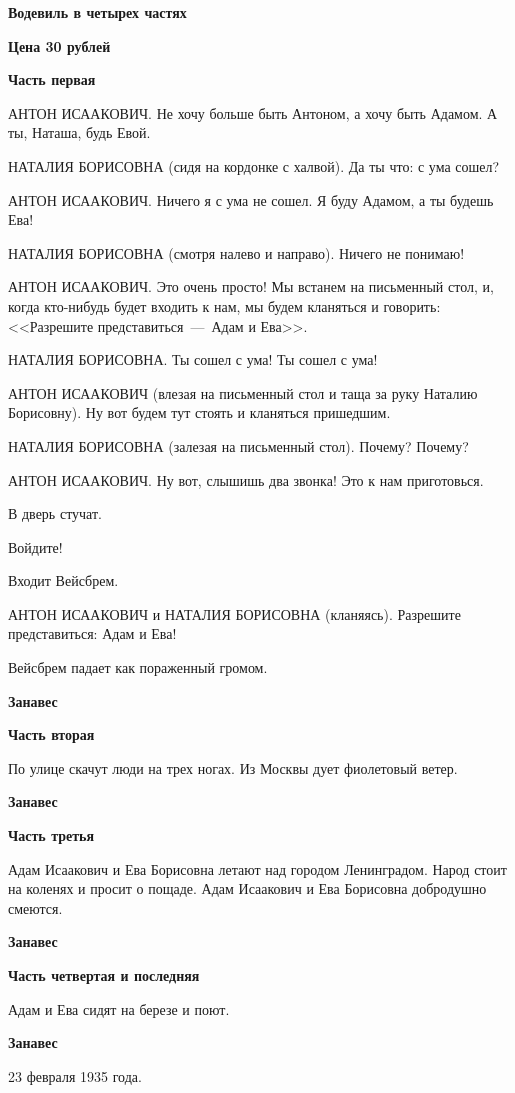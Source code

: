 \textbf{Водевиль в четырех частях}

\textbf{Цена 30 рублей}

\textbf{Часть первая}

АНТОН ИСААКОВИЧ. Не хочу больше быть Антоном, а хочу быть Адамом. А ты, Наташа, будь Евой.

НАТАЛИЯ БОРИСОВНА (сидя на кордонке с халвой). Да ты что: с ума сошел?

АНТОН ИСААКОВИЧ. Ничего я с ума не сошел. Я буду Адамом, а ты будешь Ева!

НАТАЛИЯ БОРИСОВНА (смотря налево и направо). Ничего не понимаю!

АНТОН ИСААКОВИЧ. Это очень просто! Мы встанем на письменный стол, и, когда кто-нибудь будет входить к нам, мы будем кланяться и говорить: <<Разрешите представиться\ ---~Адам и Ева>>.

НАТАЛИЯ БОРИСОВНА. Ты сошел с ума! Ты сошел с ума!

АНТОН ИСААКОВИЧ (влезая на письменный стол и таща за руку Наталию Борисовну). Ну вот будем тут стоять и кланяться пришедшим.

НАТАЛИЯ БОРИСОВНА (залезая на письменный стол). Почему? Почему?

АНТОН ИСААКОВИЧ. Ну вот, слышишь два звонка! Это к нам приготовься.

В дверь стучат.

Войдите!

Входит Вейсбрем.

АНТОН ИСААКОВИЧ и НАТАЛИЯ БОРИСОВНА (кланяясь). Разрешите представиться: Адам и Ева!

Вейсбрем падает как пораженный громом.

\textbf{Занавес}

\textbf{Часть вторая}

По улице скачут люди на трех ногах. Из Москвы дует фиолетовый ветер.

\textbf{Занавес}

\textbf{Часть третья}

Адам Исаакович и Ева Борисовна летают над городом Ленинградом. Народ стоит на коленях и просит о пощаде. Адам Исаакович и Ева Борисовна добродушно смеются.

\textbf{Занавес}

\textbf{Часть четвертая и последняя}

Адам и Ева сидят на березе и поют.

\textbf{Занавес}

23 февраля 1935 года.